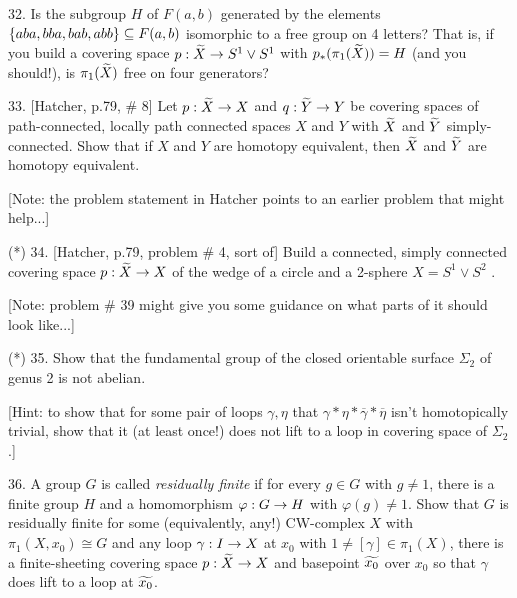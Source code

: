 \documentclass[12pt]{article}
\begin{document}
\begin{description}


\item{32.} Is the subgroup $H$ of $F(a,b)$ generated by the elements $\{aba,bba,bab,abb\}\subseteq F(a,b)$
isomorphic to a free group on 4 letters? That is, if you build a covering space $p:\widetilde{X}\rightarrow S^1\vee S^1$
with $p_*(\pi_1(\widetilde{X}))=H$ (and you should!), is $\pi_1(\widetilde{X})$ free on four generators?

\msk

\item{33.} [Hatcher, p.79, \# 8] Let $p:\widetilde{X}\rightarrow X$ and $q:\widetilde{Y}\rightarrow Y$ be covering spaces of path-connected,
locally path connected spaces $X$ and $Y$ with $\widetilde{X}$ and $\widetilde{Y}$ simply-connected.
Show that if $X$ and $Y$ are homotopy equivalent, then $\widetilde{X}$ and $\widetilde{Y}$ are homotopy
equivalent. 

\msk

\item{\spc} [Note: the problem statement in Hatcher points to an earlier problem that might help...]

\msk

\item{(*)} 34. [Hatcher, p.79, problem \# 4, sort of] Build a connected, simply connected covering 
space $p:\widetilde{X}\rightarrow X$ of the wedge of a circle and a 2-sphere $X = S^1\vee S^2$ . 

\item{\spc} [Note: problem \# 39 might give you some guidance on what parts of it should look like...]

\msk

\item{(*)} 35. Show that the fundamental group of the closed
orientable surface $\Sigma_2$ of genus 2 is not abelian. 

\msk

\item{\spc} [Hint: to show that for some pair of loops $\gamma,\eta$ 
that $\gamma*\eta*\overline{\gamma}*\overline{\eta}$ isn't homotopically trivial, show that it (at least once!)
does not lift to a loop in  covering space of $\Sigma_2$.]

\msk

\item{36.} A group $G$ is called {\it residually finite} if for every $g\in G$ with $g\neq 1$, there is a
finite group $H$ and a homomorphism $\varphi:G\rightarrow H$ with $\varphi(g)\neq 1$. Show that $G$ is residually
finite     for 
some (equivalently, any!) CW-complex $X$ with $\pi_1(X,x_0)\cong G$ and any loop $\gamma:I\rightarrow X$ at $x_0$ with 
$1\neq [\gamma]\in\pi_1(X)$, there is a finite-sheeting covering space $p:\widetilde{X}\rightarrow X$ and basepoint
$\widetilde{x_0}$ over $x_0$ so that $\gamma$ does  lift to a loop at $\widetilde{x_0}$.


\end{description}
\end{document}
